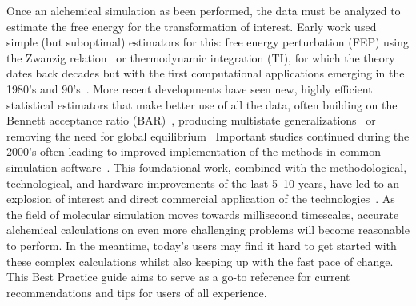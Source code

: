 \documentclass[9pt,bestpractices]{livecoms}
\begin{document}
%
Once an alchemical simulation as been performed, the data must be analyzed to estimate the free energy for the transformation of interest.
Early work used simple (but suboptimal) estimators for this: free energy perturbation (FEP) using the Zwanzig relation~\cite{zwanzig1954hightemperature} or thermodynamic integration (TI), for which the theory dates back decades but with the first computational applications emerging in the 1980's and 90's~\cite{kirkwood1935statistical, jorgensen1985monte, kollman1993free, wong1986dynamics, merz1989free}. %
More recent developments have seen new, highly efficient statistical estimators that make better use of all the data, often building on the Bennett acceptance ratio (BAR)~\cite{bennett1976efficient}, producing multistate generalizations~\cite{shirts2008statisticallya} or removing the need for global equilibrium~\cite{wu2016multiensemble, mey2014xtram, wu2014statistically}
Important studies continued during the 2000's often leading to improved implementation of the methods in common simulation software~\cite{vanderspoel2005gromacs, mermelstein2018fast, wang2015accurate, hedges2019biosimspace}. 
This foundational work, combined with the methodological, technological, and hardware improvements of the last 5--10 years, have led to an explosion of interest and direct commercial application of the technologies~\cite{wang2015accurate, fratev2019improved, schindler2020largescale, cournia2017relative, sherborne2016collaborating}.
%
As the field of molecular simulation moves towards millisecond timescales, accurate alchemical calculations on even more challenging problems will become reasonable to perform. In the meantime, today's users may find it hard to get started with these complex calculations whilst also keeping up with the fast pace of change. This Best Practice guide aims to serve as a go-to reference for current recommendations and tips for users of all experience.  
%
\end{document}
